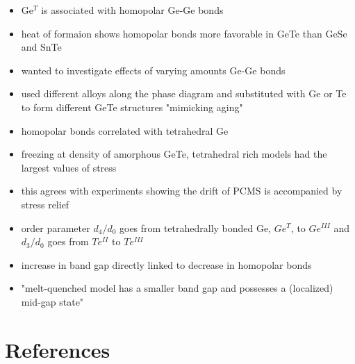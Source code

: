 \documentclass[3p,review,12pt]{elsarticle}
\begin{document}
\begin{itemize}
\begin{itemize}
 		\item Ge$^{T}$ is associated with homopolar Ge-Ge bonds
 		\item heat of formaion shows homopolar bonds more favorable in GeTe than GeSe and SnTe
 		\item wanted to investigate effects of varying amounts Ge-Ge bonds
 		\item used different alloys along the phase diagram and substituted with Ge or Te to form different GeTe structures "mimicking aging"
 		\item homopolar bonds correlated with tetrahedral Ge
 		\item freezing at density of amorphous GeTe, tetrahedral rich models had the largest values of stress
 		\item this agrees with experiments showing the drift of PCMS is accompanied by stress relief
 		\item order parameter $d_{4}/d_{0}$ goes from tetrahedrally bonded Ge, $Ge^{T}$, to $Ge^{III}$ and $d_{3}/d_{0}$ goes from $Te^{II}$ to $Te^{III}$
 		\item increase in band gap directly linked to decrease in homopolar bonds
 		\item "melt-quenched model has a smaller band gap and possesses a (localized) mid-gap state"
 	\end{itemize}	
\end{itemize}
\section*{References}



\end{document}
